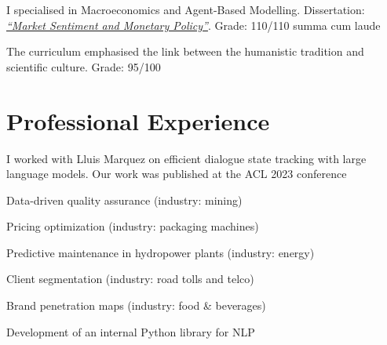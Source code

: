 \documentclass[]{cv_template}
\begin{document}
\begin{minipage}[t]{0.62\textwidth}
I specialised in Macroeconomics and Agent-Based Modelling. Dissertation: \href{https://drive.google.com/file/d/0B3_3DE5m8SV5R3F4LThXS052SDA/view}{\it \enquote{Market Sentiment and Monetary Policy}}. Grade: 110/110 summa cum laude
\sectionsep

The curriculum emphasised the link between the humanistic tradition and scientific culture. Grade: 95/100
\sectionsep




\section{Professional Experience}

I worked with Lluis Marquez on efficient dialogue state tracking with large language models. Our work was published at the ACL 2023 conference~\cite{lesci-etal-2023-diable}
\sectionsep

\vspace{.8\topsep}
\begin{tightemize}
\item Data-driven quality assurance (industry: mining)
\item Pricing optimization (industry: packaging machines)
\item Predictive maintenance in hydropower plants (industry: energy)
\item Client segmentation (industry: road tolls and telco) 
\item Brand penetration maps (industry: food \& beverages)
\item Development of an internal Python library for NLP
\end{tightemize}
\sectionsep


\end{minipage}
\end{document}
